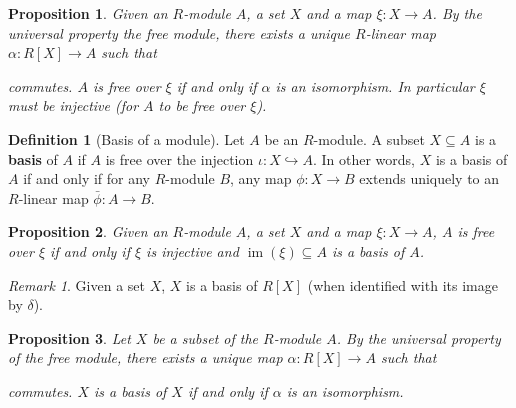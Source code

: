 \documentclass[a4paper,12pt,parskip=half*,chapterprefix=true,numbers=noendperiod]{scrreprt}
\newcommand{\opname}{\operatorname}
\newtheorem{proposition}{Proposition}[section]
\theoremstyle{definition}
\newtheorem{definition}{Definition}[section]
\theoremstyle{remark}
\newtheorem*{remark}{Remark}
\begin{document}
\begin{proposition}	
	Given an $R$-module $A$, a set $X$ and a map $\xi:X\to A$. By the universal property the free module, there exists a unique $R$-linear map $\alpha:R[X]\to A$ such that
	\begin{figure}[H]
	\centering
	\end{figure}
	commutes. $A$ is free over $\xi$ if and only if $\alpha$ is an isomorphism. In particular $\xi$ must be injective (for $A$ to be free over $\xi$).
\end{proposition}

\begin{definition}[Basis of a module]
	Let $A$ be an $R$-module. A subset $X\subseteq A$ is a \textbf{basis} of $A$ if $A$ is free over the injection $\iota:X\hookrightarrow A$. In other words, $X$ is a basis of $A$ if and only if for any $R$-module $B$, any map $\phi:X\to B$ extends uniquely to an $R$-linear map $\bar{\phi}:A\to B$. 
\end{definition}

\begin{proposition}
	Given an $R$-module $A$, a set $X$ and a map $\xi:X\to A$, $A$ is free over $\xi$ if and only if $\xi$ is injective and $\opname{im}(\xi)\subseteq A$ is a basis of $A$.
\end{proposition}
\begin{remark}
	Given a set $X$, $X$ is a basis of $R[X]$ (when identified with its image by $\delta$).
\end{remark}

\begin{proposition}
	Let $X$ be a subset of the $R$-module $A$. By the universal property of the free module, there exists a unique map $\alpha:R[X]\to A$ such that
	\begin{figure}[H]
	\centering
	\end{figure}
	commutes. $X$ is a basis of $X$ if and only if $\alpha$ is an isomorphism.
\end{proposition}
\end{document}
